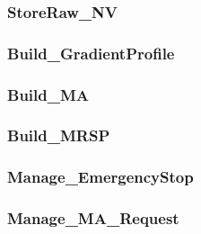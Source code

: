 \subsubsection{StoreRaw\_NV}


\subsubsection{Build\_GradientProfile}


\subsubsection{Build\_MA}


\subsubsection{Build\_MRSP}


\subsubsection{Manage\_EmergencyStop}


\subsubsection{Manage\_MA\_Request}


\

